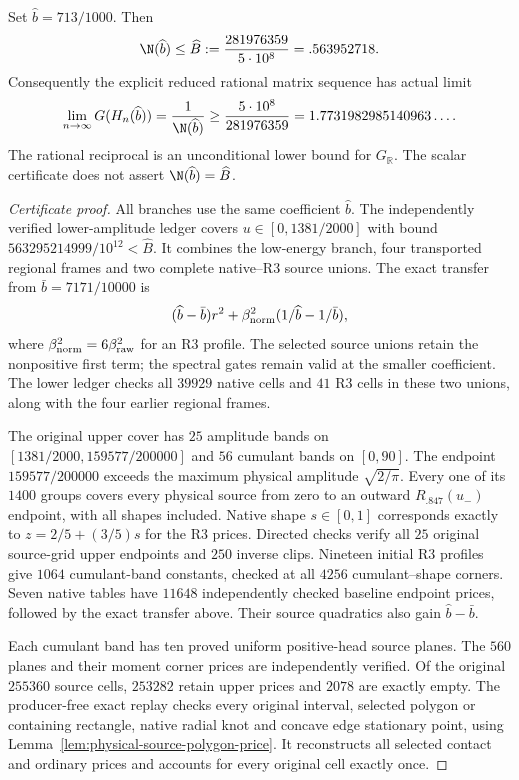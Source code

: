 \begin{theorem}
\label{thm:final-preferred-polygon}
Set $\widehat b=713/1000$. Then
\[
 \N(\widehat b)\le\widehat B:=\frac{281976359}{5\cdot10^8}
 =.563952718.
\]
Consequently the explicit reduced rational matrix sequence has actual limit
\[
 \lim_{n\to\infty}G(H_n(\widehat b))
 =\frac1{\N(\widehat b)}
 \ge\frac{5\cdot10^8}{281976359}
 =1.7731982985140963\ldots .
\]
The rational reciprocal is an unconditional lower bound for
$G_{\mathbb R}$. The scalar certificate does not assert
$\N(\widehat b)=\widehat B$.
\end{theorem}
\begin{proof}[Certificate proof]
All branches use the same coefficient $\widehat b$. The independently
verified lower-amplitude ledger covers $u\in[0,1381/2000]$ with bound
$563295214999/10^{12}<\widehat B$. It combines the low-energy branch,
four transported regional frames and two complete native--R3 source
unions. The exact transfer from $\bar b=7171/10000$ is
\[
 (\widehat b-\bar b)r^2+
 \beta_{\rm norm}^2(1/\widehat b-1/\bar b),
\]
where $\beta_{\rm norm}^2=6\beta_{\rm raw}^2$ for an R3 profile.
The selected source unions retain the nonpositive first term; the
spectral gates remain valid at the smaller coefficient. The lower
ledger checks all $39929$ native cells and $41$ R3 cells in these two
unions, along with the four earlier regional frames.

The original upper cover has $25$ amplitude bands on
$[1381/2000,159577/200000]$ and $56$ cumulant bands on $[0,90]$.
The endpoint $159577/200000$ exceeds the maximum physical amplitude
$\sqrt{2/\pi}$. Every one of its $1400$ groups covers every physical
source from zero to an outward $R_{.847}(u_-)$ endpoint, with all shapes
included. Native shape $s\in[0,1]$ corresponds exactly to
$z=2/5+(3/5)s$ for the R3 prices. Directed checks verify all $25$
original source-grid upper endpoints and $250$ inverse clips.
Nineteen initial R3 profiles give $1064$ cumulant-band constants,
checked at all $4256$ cumulant--shape corners. Seven native tables
have $11648$ independently checked baseline endpoint prices, followed
by the exact transfer above. Their source quadratics also gain
$\widehat b-\bar b$.

Each cumulant band has ten proved uniform positive-head source planes.
The $560$ planes and their moment corner prices are independently
verified. Of the original $255360$ source cells, $253282$ retain
upper prices and $2078$ are exactly empty. The producer-free exact
replay checks every original interval, selected polygon or containing
rectangle, native radial knot and concave edge stationary point, using
Lemma~\ref{lem:physical-source-polygon-price}. It reconstructs all
selected contact and ordinary prices and accounts for every original
cell exactly once.


\end{proof}
